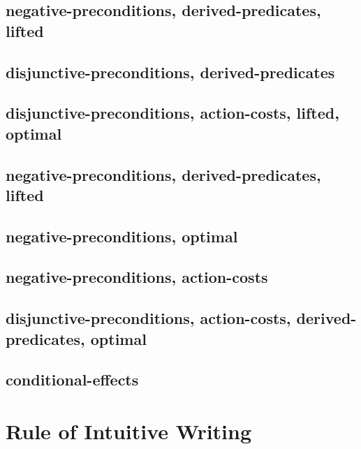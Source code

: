 \subsection{negative-preconditions, derived-predicates, lifted}
\subsection{disjunctive-preconditions, derived-predicates}
\subsection{disjunctive-preconditions, action-costs, lifted, optimal}
\subsection{}
\strips[]
\subsection{negative-preconditions, derived-predicates, lifted}
\subsection{negative-preconditions, optimal}
\subsection{negative-preconditions, action-costs}
\subsection{disjunctive-preconditions, action-costs, derived-predicates, optimal}
\subsection{conditional-effects}

\section{Rule of Intuitive Writing}

